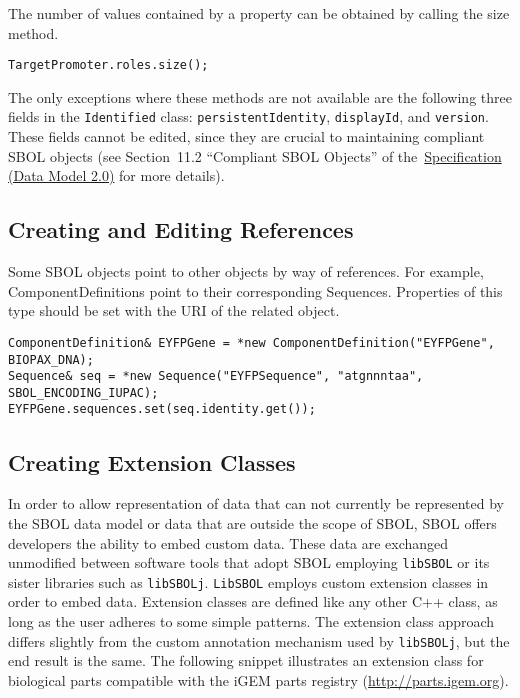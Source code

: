 The number of values contained by a property can be obtained by calling the size method.

\vspace{\abovedisplayskip}
\begin{minipage}{0.95\textwidth} 
\begin{lstlisting}
TargetPromoter.roles.size();
\end{lstlisting}
\end{minipage}

The only exceptions where these methods are not available are the following three fields in the \lstinline+Identified+ class: \lstinline+persistentIdentity+, \lstinline+displayId+, and
\lstinline+version+.  These fields cannot be edited, since they are crucial to maintaining
compliant SBOL objects (see Section~11.2 ``Compliant SBOL Objects'' of the~\href{http://sbolstandard.org/downloads/specification-data-model-2-0/}{Specification
  (Data Model 2.0)} for more details).

\subsection*{Creating and Editing References}

Some SBOL objects point to other objects by way of references. For example, ComponentDefinitions point to their corresponding Sequences. Properties of this type should be set with the URI of the related object.

\vspace{\abovedisplayskip}
\begin{minipage}{0.95\textwidth} 
\begin{lstlisting}
ComponentDefinition& EYFPGene = *new ComponentDefinition("EYFPGene", BIOPAX_DNA);
Sequence& seq = *new Sequence("EYFPSequence", "atgnnntaa", SBOL_ENCODING_IUPAC);
EYFPGene.sequences.set(seq.identity.get());
\end{lstlisting}
\end{minipage}

\subsection*{Creating Extension Classes}
In order to allow representation of data that can not currently be represented
by the SBOL data model or data that are outside the scope of SBOL,
SBOL offers developers the ability to embed custom data. These data are exchanged unmodified between software tools that adopt SBOL employing {\tt libSBOL} or its sister libraries such as {\tt libSBOLj}. {\tt LibSBOL} employs custom extension classes in order to embed data. Extension classes are defined like any other C++ class, as long as the user adheres to some simple patterns. The extension class approach differs slightly from the custom annotation mechanism used by {\tt libSBOLj}, but the end result is the same. The following snippet illustrates an extension class for biological parts compatible with the iGEM parts registry (\url{http://parts.igem.org}).

